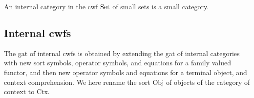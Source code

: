 \documentclass{lmcs}
\def\Obj{\mathrm{Obj}}
\def\Ctx{\mathrm{Ctx}}
\def\Hom{\mathrm{Hom}}
\def\id{\mathrm{id}}
\begin{document}
An internal category in the cwf ${\rm Set}$ of small sets is a small category.


\subsection{Internal cwfs}

The gat of internal cwfs is obtained by extending the gat of internal categories with new sort symbols, operator symbols, and equations for a family valued functor, and then new operator symbols and equations for a terminal object, and context comprehension. We here rename the sort $\Obj$ of objects of the category of context to $\Ctx$.
\end{document}
